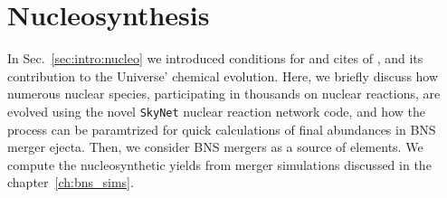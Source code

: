 
\chapter{Nucleosynthesis} \label{ch:nucleo}%




%
In Sec.~\ref{sec:intro:nucleo} we introduced conditions for and cites of
\rproc{} \nuc{}, and its contribution to the Universe' chemical evolution. 
Here, we briefly discuss how numerous nuclear species, participating in thousands on nuclear 
reactions, are evolved using the novel \texttt{SkyNet} nuclear reaction network code, and how the process can be paramtrized for quick 
calculations of final abundances in \ac{BNS} merger ejecta.
%
Then, we consider \ac{BNS} mergers as a source of \rproc{} elements. 
We compute the nucleosynthetic yields from merger simulations 
discussed in the chapter~\ref{ch:bns_sims}.






